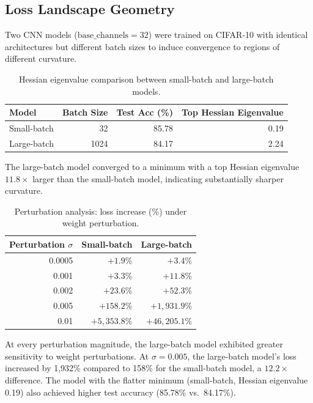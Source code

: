 \documentclass[conference]{IEEEtran}
\begin{document}
\subsection{Loss Landscape Geometry}

Two CNN models ($\text{base\_channels}=32$) were trained on CIFAR-10 with identical architectures but different batch sizes to induce convergence to regions of different curvature.

\begin{table}[htbp]
\centering
\caption{Hessian eigenvalue comparison between small-batch and large-batch models.}
\label{tab:hessian}
\begin{tabular}{@{}lrrr@{}}
\toprule
Model & Batch Size & Test Acc (\%) & Top Hessian Eigenvalue \\
\midrule
Small-batch & 32   & 85.78 & 0.19 \\
Large-batch & 1024 & 84.17 & 2.24 \\
\bottomrule
\end{tabular}
\end{table}

The large-batch model converged to a minimum with a top Hessian eigenvalue $11.8\times$ larger than the small-batch model, indicating substantially sharper curvature.

\begin{table}[htbp]
\centering
\caption{Perturbation analysis: loss increase (\%) under weight perturbation.}
\label{tab:perturbation}
\begin{tabular}{@{}rrr@{}}
\toprule
Perturbation $\sigma$ & Small-batch & Large-batch \\
\midrule
0.0005 & $+1.9\%$     & $+3.4\%$ \\
0.001  & $+3.3\%$     & $+11.8\%$ \\
0.002  & $+23.6\%$    & $+52.3\%$ \\
0.005  & $+158.2\%$   & $+1{,}931.9\%$ \\
0.01   & $+5{,}353.8\%$ & $+46{,}205.1\%$ \\
\bottomrule
\end{tabular}
\end{table}

At every perturbation magnitude, the large-batch model exhibited greater sensitivity to weight perturbations. At $\sigma = 0.005$, the large-batch model's loss increased by 1,932\% compared to 158\% for the small-batch model, a $12.2\times$ difference. The model with the flatter minimum (small-batch, Hessian eigenvalue 0.19) also achieved higher test accuracy (85.78\% vs.\ 84.17\%).
\end{document}
